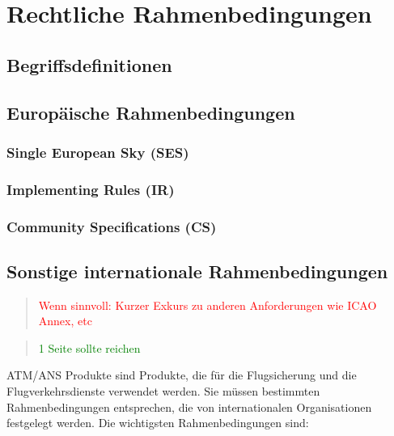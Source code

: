 \chapter{Rechtliche Rahmenbedingungen}

    \section{Begriffsdefinitionen}
        
        \pagebreak

        
    \section{Europäische Rahmenbedingungen}
        \subsection{Single European Sky (\acs{SES})}
            
            \pagebreak
            
        \subsection{Implementing Rules (\acs{IR})}
            
            \pagebreak
        
        \subsection{Community Specifications (\acs{CS})}
            
                \pagebreak

    \section{Sonstige internationale Rahmenbedingungen}

    \begin{quote}
\textcolor{red}{Wenn sinnvoll: Kurzer Exkurs zu anderen Anforderungen wie ICAO Annex, etc}
\end{quote}
\begin{quote}
\textcolor{green}{1 Seite sollte reichen}
\end{quote}

ATM/ANS Produkte sind Produkte, die für die Flugsicherung und die Flugverkehrsdienste verwendet werden. Sie müssen bestimmten Rahmenbedingungen entsprechen, die von internationalen Organisationen festgelegt werden. Die wichtigsten Rahmenbedingungen sind:

